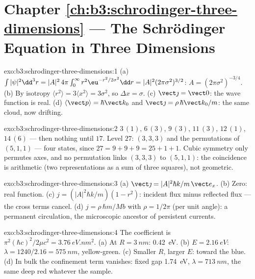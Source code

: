 \section*{Chapter \ref{ch:b3:schrodinger-three-dimensions} --- The Schrödinger Equation in Three Dimensions}

\begin{solution}{exo:b3:schrodinger-three-dimensions:1}
(a) $\int|\psi|^2\dd^3r = |A|^2\,4\pi\int_0^\infty r^2\eu^{-r^2/2
\sigma^2}\dd r = |A|^2(2\pi\sigma^2)^{3/2}$: $A = (2\pi\sigma^2)^{
-3/4}$. (b) By isotropy $\langle r^2\rangle = 3\langle x^2\rangle =
3\sigma^2$, so $\Delta x = \sigma$. (c) $\vect\jmath = \vect 0$: the
wave function is real. (d) $\langle\vect p\rangle = \hbar\vect k_0$
and $\vect\jmath = \rho\,\hbar\vect k_0/m$: the same cloud, now
drifting.
\end{solution}

\begin{solution}{exo:b3:schrodinger-three-dimensions:2}
$3\,(1)$, $6\,(3)$, $9\,(3)$, $11\,(3)$, $12\,(1)$, $14\,(6)$ ---
then nothing until $17$. Level $27$: $(3,3,3)$ and the permutations
of $(5,1,1)$ --- four states, since $27 = 9+9+9 = 25+1+1$. Cubic
symmetry only permutes axes, and no permutation links $(3,3,3)$ to
$(5,1,1)$: the coincidence is arithmetic (two representations as a
sum of three squares), not geometric.
\end{solution}

\begin{solution}{exo:b3:schrodinger-three-dimensions:3}
(a) $\vect\jmath = |A|^2\hbar k/m\,\vect e_x$. (b) Zero: real
function. (c) $j = (|A|^2\hbar k/m)(1 - r^2)$: incident flux minus
reflected flux --- the cross terms cancel. (d) $j = \rho\,\hbar
m/Mb$ with $\rho = 1/2\pi$ (per unit angle): a permanent
circulation, the microscopic ancestor of persistent currents.
\end{solution}

\begin{solution}{exo:b3:schrodinger-three-dimensions:4}
The coefficient is $\pi^2(\hbar c)^2/2\mu c^2 = \qty{3.76}{eV.nm^2}$.
(a) At $R = \qty{3}{nm}$: \qty{0.42}{eV}. (b) $E = \qty{2.16}{eV}$:
$\lambda = 1240/2.16 = \qty{575}{nm}$, yellow-green. (c) Smaller $R$,
larger $E$: toward the blue. (d) In bulk the confinement term
vanishes: fixed gap \qty{1.74}{eV}, $\lambda = \qty{713}{nm}$, the
same deep red whatever the sample.
\end{solution}

